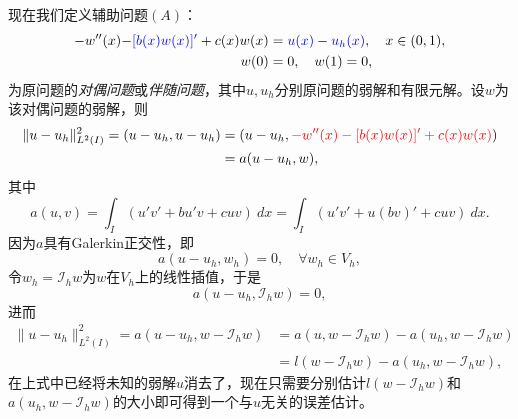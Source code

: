 \documentclass[a4paper,10pt]{ctexart}
\begin{document}
现在我们定义辅助问题$ (A) $：
\begin{equation}
    \begin{aligned}
        -w''(x) \textcolor{blue}{-[b(x)w(x)]'}+ c(x)w(x) &= \textcolor{blue}{u(x)-u_h(x)},\quad x\in (0,1),\\
        w(0) &= 0,\quad w(1) = 0,
    \end{aligned}
\end{equation}
为原问题的\emph{对偶问题}或\emph{伴随问题}，其中$ u,u_h $分别原问题的弱解和有限元解。设$ w $为该对偶问题的弱解，则
\[
    \begin{aligned}
        \| u - u_h \|_{L^2(I)}^2 = (u-u_h,u-u_h) 
        &= (u-u_h,\textcolor{red}{-w''(x) -[b(x)w(x)]'+ c(x)w(x)})\\
        &= a(u-u_h,w),
    \end{aligned}
\]
其中
\[
    a(u,v) = \int_I (u'v'+bu'v+cuv)\ dx = \int_I (u'v'+u(bv)'+cuv)\ dx.
\]
因为$ a $具有Galerkin正交性，即
\[
    a(u-u_h,w_h) = 0,\quad \forall w_h\in V_h,
\]
令$ w_h = \mathcal{I}_h w $为$ w $在$ V_h $上的线性插值，于是
\[
    a(u-u_h,\mathcal{I}_h w) = 0,
\]
进而
\[
    \begin{aligned}
        \| u - u_h \|_{L^2(I)}^2 = a(u-u_h,w-\mathcal{I}_h w) 
        &= a(u,w-\mathcal{I}_h w) - a(u_h,w-\mathcal{I}_h w)\\
        &= l(w-\mathcal{I}_h w) - a(u_h,w-\mathcal{I}_h w),
    \end{aligned}
\]
在上式中已经将未知的弱解$ u $消去了，现在只需要分别估计$ l(w-\mathcal{I}_h w) $和$ a(u_h,w-\mathcal{I}_h w) $的大小即可得到一个与$ u $无关的误差估计。
\end{document}
